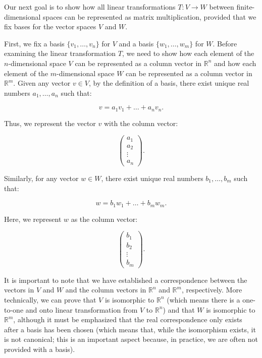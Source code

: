 \documentclass[
]{book}
\theoremstyle{definition}
\theoremstyle{definition}
\theoremstyle{definition}
\theoremstyle{definition}
\theoremstyle{remark}
\begin{document}
Our next goal is to show how all linear transformations \(T: V \to W\) between finite-dimensional spaces can be represented as matrix multiplication, provided that we fix bases for the vector spaces \(V\) and \(W\).

First, we fix a basis \(\{v_1, \dots, v_n\}\) for \(V\) and a basis \(\{w_1, \dots, w_m\}\) for \(W\). Before examining the linear transformation \(T\), we need to show how each element of the \(n\)-dimensional space \(V\) can be represented as a column vector in \(\mathbb{R}^n\) and how each element of the \(m\)-dimensional space \(W\) can be represented as a column vector in \(\mathbb{R}^m\). Given any vector \(v \in V\), by the definition of a basis, there exist unique real numbers \(a_1, \dots, a_n\) such that:

\[
v = a_1v_1 + \dots + a_nv_n.
\]

Thus, we represent the vector \(v\) with the column vector:

\[
\begin{pmatrix} a_1 \\ a_2 \\ \vdots \\ a_n \end{pmatrix}.
\]

Similarly, for any vector \(w \in W\), there exist unique real numbers \(b_1, \dots, b_m\) such that:

\[
w = b_1w_1 + \dots + b_mw_m.
\]

Here, we represent \(w\) as the column vector:

\[
\begin{pmatrix} b_1 \\ b_2 \\ \vdots \\ b_m \end{pmatrix}.
\]

It is important to note that we have established a correspondence between the vectors in \(V\) and \(W\) and the column vectors in \(\mathbb{R}^n\) and \(\mathbb{R}^m\), respectively. More technically, we can prove that \(V\) is isomorphic to \(\mathbb{R}^n\) (which means there is a one-to-one and onto linear transformation from \(V\) to \(\mathbb{R}^n\)) and that \(W\) is isomorphic to \(\mathbb{R}^m\), although it must be emphasized that the real correspondence only exists after a basis has been chosen (which means that, while the isomorphism exists, it is not canonical; this is an important aspect because, in practice, we are often not provided with a basis).
\end{document}
